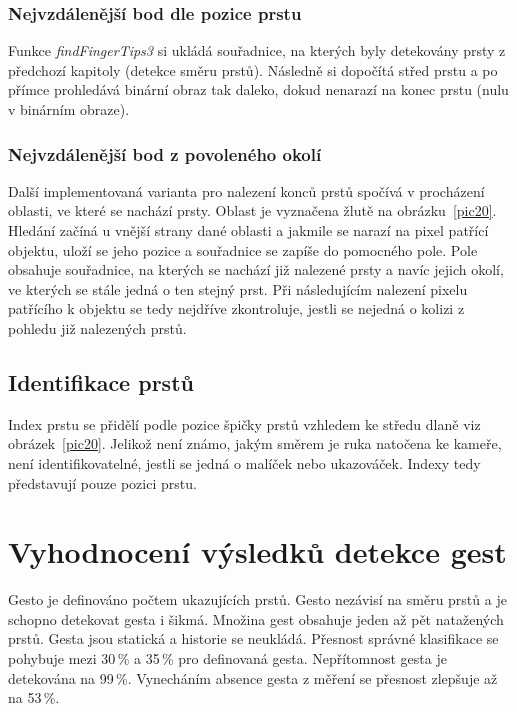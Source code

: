 \subsubsection{Nejvzdálenější bod dle pozice prstu}
Funkce \textit{findFingerTips3} si ukládá souřadnice, na kterých byly detekovány prsty z předchozí kapitoly (detekce směru prstů). Následně si dopočítá střed prstu a po přímce prohledává binární obraz tak daleko, dokud nenarazí na konec prstu (nulu v binárním obraze). 

\subsubsection{Nejvzdálenější bod z povoleného okolí}
Další implementovaná varianta pro nalezení konců prstů spočívá v procházení oblasti, ve které se nachází prsty. Oblast je vyznačena žlutě na obrázku~\ref{pic20}. Hledání začíná u vnější strany dané oblasti a jakmile se narazí na pixel patřící objektu, uloží se jeho pozice a souřadnice se zapíše do pomocného pole. Pole obsahuje souřadnice, na kterých se nachází již nalezené prsty a navíc jejich okolí, ve kterých se stále jedná o ten stejný prst. Při následujícím nalezení pixelu patřícího k objektu se tedy nejdříve zkontroluje, jestli se nejedná o kolizi z pohledu již nalezených prstů.

\subsection{Identifikace prstů}
Index prstu se přidělí podle pozice špičky prstů vzhledem ke středu dlaně viz obrázek~\ref{pic20}. Jelikož není známo, jakým směrem je ruka natočena ke kameře, není identifikovatelné, jestli se jedná o malíček nebo ukazováček. Indexy tedy představují pouze pozici prstu.
\newpage
\section{Vyhodnocení výsledků detekce gest}

Gesto je definováno počtem ukazujících prstů. Gesto nezávisí na směru prstů a je schopno detekovat gesta i šikmá. Množina gest obsahuje jeden až pět natažených prstů. Gesta jsou statická a historie se neukládá. Přesnost správné klasifikace se pohybuje mezi 30\,\% a 35\,\% pro definovaná gesta. Nepřítomnost gesta je detekována na 99\,\%. Vynecháním absence gesta z měření se přesnost zlepšuje až na 53\,\%.

